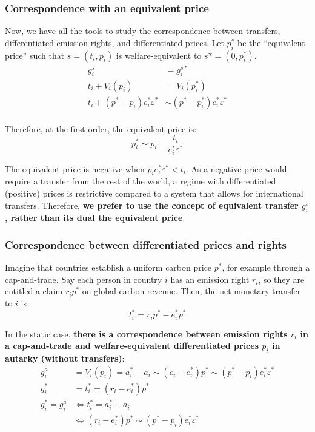 \documentclass[12pt,english]{article}
\begin{document}
\subsubsection*{Correspondence with an equivalent
price}\label{correspondence-with-an-equivalent-price}

Now, we have all the tools to study the correspondence between transfers, differentiated emission rights, and differentiated prices.
Let $p^*_i$ be the ``equivalent price'' such that $s=(t_i, p_i)$ is welfare-equivalent to $s*=(0, p^*_i)$. $$\begin{aligned}
g^s_i &= g^{s*}_i \\
t_i + V_i(p_i) &= V_i(p^*_i) \\
t_i + (p^* - p_i) e^*_i  \varepsilon^* &\sim (p^* - p^*_i) e^*_i  \varepsilon^* \\
\end{aligned}$$

Therefore, at the first order, the equivalent price is:
$$p^*_i \sim p_i - \frac{t_i}{e^*_i  \varepsilon^* } $$

The equivalent price is negative when $p_i e^*_i  \varepsilon^* < t_i$. As a negative price would require a transfer from the rest of the world, a regime with differentiated (positive) prices is restrictive compared to a system that allows for international transfers. Therefore, \textbf{we prefer to use the concept of equivalent transfer $g^s_i$, rather than its dual the equivalent price}. 


\subsubsection*{Correspondence between differentiated prices and
rights}\label{correspondence-between-differentiated-prices-and-rights}

Imagine that countries establish a uniform carbon price $p^*$, for example through a cap-and-trade. Say each person in country $i$ has an emission right $r_i$, so they are entitled a claim $r_i p^*$ on global carbon revenue. Then, the net monetary transfer to $i$ is $$t^*_i = r_i p^* - e^*_i p^*$$

In the static case, \textbf{there is a correspondence between emission
rights $r_i$ in a cap-and-trade and welfare-equivalent differentiated prices $p_i$ in
autarky (without transfers)}: $$\begin{aligned}
g^a_i &= V_i(p_i) = a^*_i - a_i \sim (e_i - e^*_i) p^* \sim (p^* - p_i) e^*_i  \varepsilon^* \\
g^*_i &= t^*_i = (r_i - e^*_i) p^* \\
g^*_i = g^a_i &\Leftrightarrow t^*_i = a^*_i - a_i \\
&\Leftrightarrow (r_i - e^*_i) p^* \sim (p^* - p_i) e^*_i  \varepsilon^*
\end{aligned}$$
\end{document}
